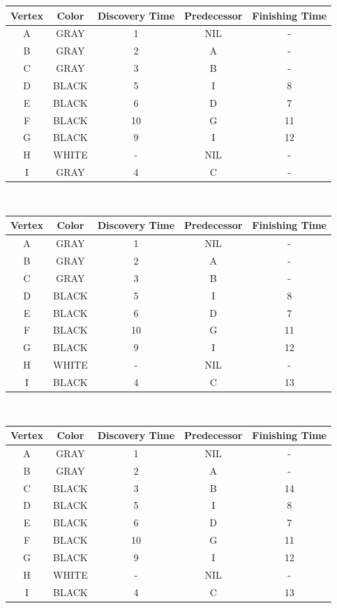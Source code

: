 \documentclass[12pt]{article}
\theoremstyle{plain}
\newcommand{\vs}{\vspace{2mm}}
\begin{document}
\begin{tabular}{|c|c|c|c|c|}
    \hline
    Vertex & Color & Discovery Time & Predecessor & Finishing Time \\ \hline
    A & GRAY & 1 & NIL & - \\ \hline
    B & GRAY & 2 & A & - \\ \hline
    C & GRAY & 3 & B & - \\ \hline
    D & BLACK & 5 & I & 8 \\ \hline
    E & BLACK & 6 & D & 7 \\ \hline
    F & BLACK & 10 & G & 11 \\ \hline
    G & BLACK & 9 & I & 12 \\ \hline
    H & WHITE & - & NIL & - \\ \hline
    I & GRAY & 4 & C & - \\ \hline
\end{tabular}
\vs\

\begin{tabular}{|c|c|c|c|c|}
    \hline
    Vertex & Color & Discovery Time & Predecessor & Finishing Time \\ \hline
    A & GRAY & 1 & NIL & - \\ \hline
    B & GRAY & 2 & A & - \\ \hline
    C & GRAY & 3 & B & - \\ \hline
    D & BLACK & 5 & I & 8 \\ \hline
    E & BLACK & 6 & D & 7 \\ \hline
    F & BLACK & 10 & G & 11 \\ \hline
    G & BLACK & 9 & I & 12 \\ \hline
    H & WHITE & - & NIL & - \\ \hline
    I & BLACK & 4 & C & 13 \\ \hline
\end{tabular}
\vs\

\begin{tabular}{|c|c|c|c|c|}
    \hline
    Vertex & Color & Discovery Time & Predecessor & Finishing Time \\ \hline
    A & GRAY & 1 & NIL & - \\ \hline
    B & GRAY & 2 & A & - \\ \hline
    C & BLACK & 3 & B & 14 \\ \hline
    D & BLACK & 5 & I & 8 \\ \hline
    E & BLACK & 6 & D & 7 \\ \hline
    F & BLACK & 10 & G & 11 \\ \hline
    G & BLACK & 9 & I & 12 \\ \hline
    H & WHITE & - & NIL & - \\ \hline
    I & BLACK & 4 & C & 13 \\ \hline
\end{tabular}
\vs\
\end{document}

